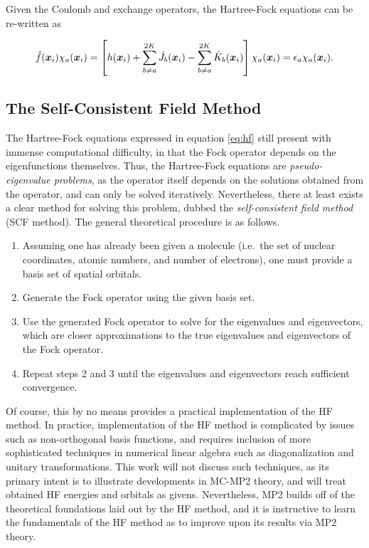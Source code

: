 Given the Coulomb and exchange operators, the Hartree-Fock equations can be
re-written as

\begin{equation}
\hat f(\bm x_i) \chi_a (\bm x_i) =
\left[ h(\bm x_i)
+ \sum_{b \neq a}^{2K} \hat J_b (\bm x_i)
- \sum_{b \neq a}^{2K} \hat K_b (\bm x_i) \right] \chi_a (\bm x_i)
= \epsilon_a \chi_a(\bm x_i).
\label{eq:hf}
\end{equation}

\subsection{The Self-Consistent Field Method}

The Hartree-Fock equations expressed in equation \ref{eq:hf} still present with
immense computational difficulty, in that the Fock operator depends on the
eigenfunctions themselves. Thus, the Hartree-Fock equations are
\emph{pseudo-eigenvalue problems}, as the operator itself depends on the
solutions obtained from the operator, and can only be solved iteratively.
Nevertheless, there at least exists a clear method for solving this problem,
dubbed the \emph{self-consistent field method} (SCF method). The general
theoretical procedure is as follows.

\begin{enumerate}
	\item Assuming one has already been given a molecule (i.e.\ the set of
		nuclear coordinates, atomic numbers, and number of electrons),
		one must provide a basis set of spatial orbitals.

	\item Generate the Fock operator using the given basis set.

	\item Use the generated Fock operator to solve for the eigenvalues and
		eigenvectors, which are closer approximations to the true
		eigenvalues and eigenvectors of the Fock operator.

	\item Repeat steps 2 and 3 until the eigenvalues and eigenvectors reach
		sufficient convergence.
\end{enumerate}

Of course, this by no means provides a practical implementation of the HF
method. In practice, implementation of the HF method is complicated by issues
such as non-orthogonal basis functions, and requires inclusion of more
sophisticated techniques in numerical linear algebra such as diagonalization and
unitary transformations. This work will not discuss such techniques, as its
primary intent is to illustrate developments in MC-MP2 theory, and will treat
obtained HF energies and orbitals as givens. Nevertheless, MP2 builds off of the
theoretical foundations laid out by the HF method, and it is instructive to
learn the fundamentals of the HF method as to improve upon its results via MP2
theory.

